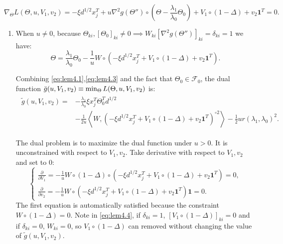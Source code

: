 \begin{equation}
    \label{eq:lem4.2}
    \nabla_\Theta L(\Theta,u,V_1,v_2)=-\xi d^{1/2}x_j^T+u\nabla^2g(\Theta'')\circ(\Theta-\frac{\lambda_1}{\lambda_0}\Theta_{0})+V_1\circ(1-\Delta)+v_2\mathbf{1}^T=0.
\end{equation}

\begin{enumerate}
    \item When $u\neq 0$, because $\Theta_{ki},[\Theta_0]_{ki}\neq0\implies W_{ki}[\nabla^2g(\Theta'')]_{ki}=\delta_{ki}=1$ we have:
    \begin{equation}
        \label{eq:lem4.3}
        \Theta=\frac{\lambda_1}{\lambda_0}\Theta_{0}-\frac{1}{u}W\circ\left(-\xi d^{1/2}x_j^T+V_1\circ(1-\Delta)+v_2\mathbf{1}^T\right).
    \end{equation}

    Combining \eqref{eq:lem4.1},\eqref{eq:lem4.3} and the fact that $\Theta_{0}\in\mathcal{F}_{0}$, the dual function $\\\bar{g}(u,V_1,v_2)\equiv\min_\Theta L(\Theta,u,V_1,v_2)$ is:
    \begin{gather}
        \label{eq:lem4.4}
        \begin{aligned}
            \tilde{g}(u,V_1,v_2)=&-\frac{\lambda_1}{\lambda_0}\xi x_j^T\Theta_{0}^Td^{1/2}\\
            &-\frac{1}{2u}\left\langle W,\left( -\xi d^{1/2} x_j^T+V_1\circ(1-\Delta)+v_2\mathbf{1}^T\right)^{\circ2}\right\rangle-\frac{1}{2}ur(\lambda_1,\lambda_0)^2.
        \end{aligned}
    \end{gather}

    The dual problem is to maximize the dual function under $u> 0$. It is unconstrained with respect to $V_1,v_2$. Take derivative with respect to $V_1,v_2$ and set to 0:
    \begin{equation}
        \label{eq:lem4.5}
        \begin{cases}
        \frac{\partial}{\partial V_1}=-\frac{1}{u}W\circ(1-\Delta)\circ\left(-\xi d^{1/2} x_j^T+V_1\circ(1-\Delta)+v_2\mathbf{1}^T\right)=0,\\
        \frac{\partial}{\partial v_2}=-\frac{1}{u}W\circ\left( -\xi d^{1/2} x_j^T+V_1\circ(1-\Delta)+v_2\mathbf{1}^T\right)\mathbf{1}=0.
        \end{cases}
    \end{equation}
    The first equation is automatically satisfied because the constraint $W\circ(1-\Delta)=0$. Note in \eqref{eq:lem4.4}, if $\delta_{ki}=1$, $[V_1\circ(1-\Delta)]_{ki}=0$ and if $\delta_{ki}=0$, $W_{ki}=0$, so $V_1\circ(1-\Delta)$ can removed without changing the value of $\tilde{g}(u,V_1,v_2)$.


\end{enumerate}
